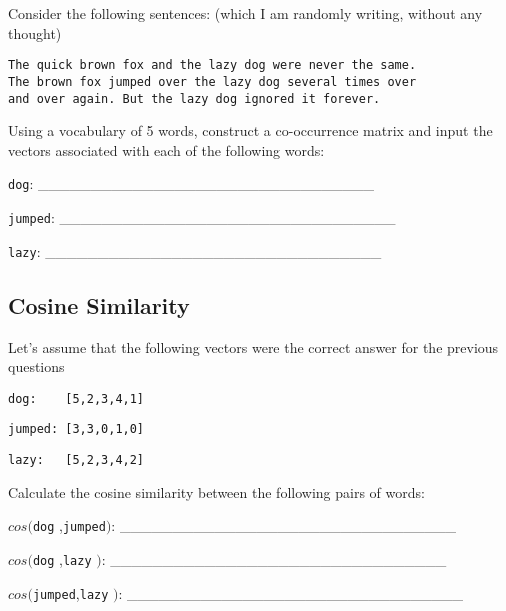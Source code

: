 \documentclass[a4paper,11pt]{scrartcl}
\begin{document}
Consider the following sentences: (which I am randomly writing, without any
thought)

{\singlespacing
\begin{verbatim}
The quick brown fox and the lazy dog were never the same.
The brown fox jumped over the lazy dog several times over
and over again. But the lazy dog ignored it forever.
\end{verbatim}
}

Using a vocabulary of 5 words, construct a co-occurrence matrix
and input the vectors associated with each of the following words:


\verb|dog|:    \_\_\_\_\_\_\_\_\_\_\_\_\_\_\_\_\_\_\_\_\_\_\_\_\_\_\_\_\_\_\_\_

\verb|jumped|: \_\_\_\_\_\_\_\_\_\_\_\_\_\_\_\_\_\_\_\_\_\_\_\_\_\_\_\_\_\_\_\_

\verb|lazy|:   \_\_\_\_\_\_\_\_\_\_\_\_\_\_\_\_\_\_\_\_\_\_\_\_\_\_\_\_\_\_\_\_


\subsection{Cosine Similarity}

Let's assume that the following vectors were the correct answer for the previous questions

\verb|dog:    [5,2,3,4,1]|

\verb|jumped: [3,3,0,1,0]|

\verb|lazy:   [5,2,3,4,2]|

 

Calculate the cosine similarity between the following pairs of words:

$cos($\verb|dog|   ,\verb|jumped|$)$: \_\_\_\_\_\_\_\_\_\_\_\_\_\_\_\_\_\_\_\_\_\_\_\_\_\_\_\_\_\_\_\_

$cos($\verb|dog|   ,\verb|lazy|  $)$: \_\_\_\_\_\_\_\_\_\_\_\_\_\_\_\_\_\_\_\_\_\_\_\_\_\_\_\_\_\_\_\_

$cos($\verb|jumped|,\verb|lazy|  $)$: \_\_\_\_\_\_\_\_\_\_\_\_\_\_\_\_\_\_\_\_\_\_\_\_\_\_\_\_\_\_\_\_
\end{document}
